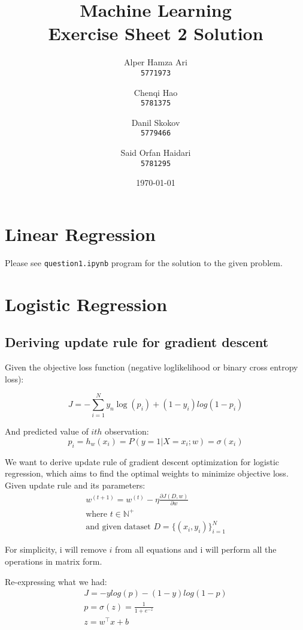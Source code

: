 \documentclass{article}
\title{
Machine Learning \\
[0.2em]Exercise Sheet 2 Solution
}
\author{
  Alper Hamza Ari\\
  \texttt{5771973}
  \and
  Chenqi Hao\\
  \texttt{5781375}
  \and
  Danil Skokov\\
  \texttt{5779466}
  \and
  Said Orfan Haidari\\
  \texttt{5781295}
}
\date{\today}
\begin{document}
\raggedright
\maketitle

\section{Linear Regression}
Please see \texttt{question1.ipynb} program for the solution to the given problem. 

\section{Logistic Regression}

\subsection{Deriving update rule for gradient descent }
Given the objective loss function (negative loglikelihood or binary cross entropy loss):

\begin{equation}
    J = -\sum^{N}_{i=1}{y_n}{\log(p_i)}+(1-y_i)log(1-p_i)
\end{equation}

And predicted value of $ith$ observation:
\begin{equation}
    p_i = h_w(x_i) = P(y=1|X=x_i;w) = \sigma(x_i)
\end{equation}

We want to derive update rule of gradient descent optimization for logistic regression, which aims to find the optimal weights to minimize objective loss.\\
Given update rule and its parameters:
\begin{equation}
    \begin{gathered}
        w^{(t+1)} = w^{(t)}-\eta\frac{\partial J(D,w)}{\partial w}\\
        \text{where } t \in \mathds{N}^+\\
         \text{and given dataset } D= \{ (x_i, y_i) \} ^{N}_{i=1}
    \end{gathered}
\end{equation}

For simplicity, i will remove $i$ from all equations and i will perform all the operations in matrix form.

Re-expressing what we had:
\begin{equation} \label{chain}
    \begin{gathered}
        J = -y log(p) - (1-y) log(1-p)\\
        p = \sigma(z) = \frac{1}{1+e^{-z}}\\
        z = w^{\intercal} x + b
    \end{gathered}
\end{equation}
\end{document}
